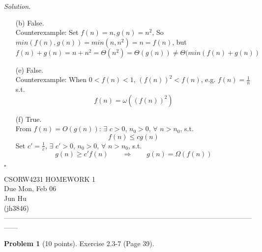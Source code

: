 \documentclass[11pt]{article}
\theoremstyle{definition}
\newtheorem{problem}{Problem}
\newenvironment{solution}{\noindent\emph{Solution.}}{\hfill$\square$}
\begin{document}
\begin{solution}
  \begin{enumerate}
    \item[(b)]
    False.\\
    Counterexample:
    Set $f(n) = n, g(n) = n^2$, So $min(f(n), g(n)) = min(n, n^2) = n = f(n)$, but
    $$f(n) + g(n) =  n + n^2 = \Theta(n^2) = \Theta(g(n))  \neq \Theta(min(f(n) + g(n)) $$
   
    \item[(e)]
    False.\\
    Counterexample:
    When $0 < f(n) < 1$, $(f(n))^2 < f(n)$, e.g. $f(n) = \frac{1}{n}$ s.t. 
    $$f(n) = \omega((f(n))^2)$$
    
    \item[(f)]
    True.\\
    From $f(n) = O(g(n))$: 
    $ \exists$ $c>0$, $n_0>0$, $\forall$ $n > n_0$, s.t.
    $$f(n) \leq cg(n)$$
    Set $c'=\frac{1}{c}$, $ \exists$ $c'>0$, $n_0>0$, $\forall$ $n > n_0$, s.t.
    $$g(n) \geq c'f(n) \qquad \Rightarrow \qquad g(n) = \Omega(f(n))$$
    
    
  \end{enumerate}
\end{solution}

\newpage
\begin{center}
\Large{} 
CSORW4231 HOMEWORK 1 \\
\normalsize{}
Due Mon, Feb 06 \\
\large{Jun Hu \\
(jh3846)} \\ 
------------------------------------------------------------------------------------------------------------------
\end{center}


\begin{problem}[10 points]
  Exercise 2.3-7 (Page 39).
\end{problem}
\end{document}
